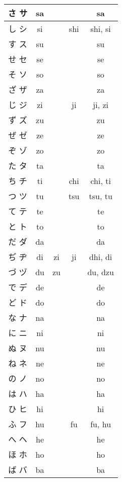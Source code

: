 \documentclass{article}
\begin{document}
\begin{center}
\begin{japanese}
\begin{longtable}{|c|c c c|c|}
                さ サ & sa &&& sa \\ \hline
                し シ & si && shi & shi, si \\ \hline
                す ス & su &&& su \\ \hline
                せ セ & se &&& se \\ \hline
                そ ソ & so &&& so \\ \hline
                ざ ザ & za &&& za \\ \hline
                じ ジ & zi && ji & ji, zi \\ \hline
                ず ズ & zu &&& zu \\ \hline
                ぜ ゼ & ze &&& ze \\ \hline
                ぞ ゾ & zo &&& zo \\ \hline
                た タ & ta &&& ta \\ \hline
                ち チ & ti && chi & chi, ti \\ \hline
                つ ツ & tu && tsu & tsu, tu \\ \hline
                て テ & te &&& te \\ \hline
                と ト & to &&& to \\ \hline
                だ ダ & da &&& da \\ \hline
                ぢ ヂ & di & zi & ji & dhi, di \\ \hline
                づ ヅ & du & zu && du, dzu \\ \hline
                で デ & de &&& de \\ \hline
                ど ド & do &&& do \\ \hline
                な ナ & na &&& na \\ \hline
                に ニ & ni &&& ni \\ \hline
                ぬ ヌ & nu &&& nu \\ \hline
                ね ネ & ne &&& ne \\ \hline
                の ノ & no &&& no \\ \hline
                は ハ & ha &&& ha \\ \hline
                ひ ヒ & hi &&& hi \\ \hline
                ふ フ & hu && fu & fu, hu \\ \hline
                へ ヘ & he &&& he \\ \hline
                ほ ホ & ho &&& ho \\ \hline
                ば バ & ba &&& ba \\ \hline

\end{longtable}
\end{japanese}
\end{center}
\end{document}
